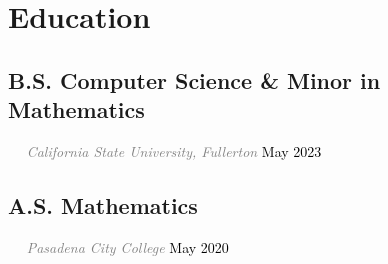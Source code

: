 \documentclass{article}
\newcommand{\resumesection}[3]{
    \subsection*{#1}
    \ 
    \ 
    \small
    \textcolor{grey}{\emph{#2}}
    \normalsize
    \hfill
    \textcolor{black}{#3}
    \normalsize
}
\begin{document}
\pagestyle{useheader}
\section*{Education}
\resumesection{B.S. Computer Science \& Minor in Mathematics}{California State University, Fullerton}{May 2023}
\resumesection{A.S. Mathematics}{Pasadena City College}{May 2020}
\end{document}
